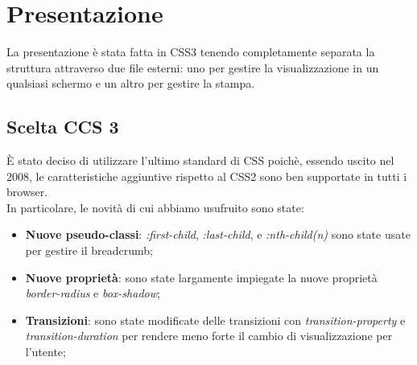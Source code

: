 \section{Presentazione}
	La presentazione è stata fatta in CSS3 tenendo completamente separata la struttura attraverso due file esterni: uno per gestire la visualizzazione in un qualsiasi schermo e un altro per gestire la stampa.
	\subsection{Scelta CCS 3}

	È stato deciso di utilizzare l'ultimo standard di CSS poichè, essendo uscito nel 2008, le  caratteristiche aggiuntive rispetto al CSS2 sono ben supportate in tutti i browser. \\ In particolare, le novità di cui abbiamo usufruito sono state:
	\begin{itemize}
		\item \textbf{Nuove pseudo-classi}: \emph{:first-child}, \emph{:last-child}, e \emph{:nth-child(n)} sono state usate per gestire il breadcrumb;
		\item \textbf{Nuove proprietà}: sono state largamente impiegate la nuove proprietà \emph{border-radius} e \emph{box-shadow};
		\item \textbf{Transizioni}: sono state modificate delle transizioni con \emph{transition-property} e \emph{transition-duration} per rendere meno forte il cambio di visualizzazione per l'utente;
	\end{itemize}
